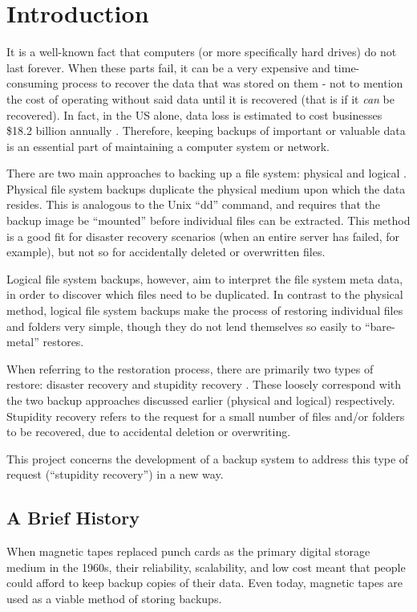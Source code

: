 \chapter{Introduction}

It is a well-known fact that computers (or more specifically hard drives) do
not last forever. When these parts fail, it can be a very expensive and
time-consuming process to recover the data that was stored on them - not to
mention the cost of operating without said data until it is recovered (that is
if it \emph{can} be recovered). In fact, in the US alone, data loss is
estimated to cost businesses \$18.2 billion annually \cite{smith03}. Therefore,
keeping backups of important or valuable data is an essential part of
maintaining a computer system or network.

There are two main approaches to backing up a file system: physical and
logical \cite{hutchinson99}. Physical file system backups duplicate the physical
medium upon which the data resides. This is analogous to the Unix ``dd''
command, and requires that the backup image be ``mounted'' before individual
files can be extracted. This method is a good fit for disaster recovery
scenarios (when an entire server has failed, for example), but not so for
accidentally deleted or overwritten files.

Logical file system backups, however, aim to interpret the file system meta
data, in order to discover which files need to be duplicated.  In contrast to
the physical method, logical file system backups make the process of restoring
individual files and folders very simple, though they do not lend themselves so
easily to ``bare-metal'' restores.

When referring to the restoration process, there are primarily two types of
restore: disaster recovery and stupidity recovery \cite{hutchinson99}. These
loosely correspond with the two backup approaches discussed earlier (physical
and logical) respectively. Stupidity recovery refers to the request for a small
number of files and/or folders to be recovered, due to accidental deletion or
overwriting.

This project concerns the development of a backup system to address this type
of request (``stupidity recovery'') in a new way.

\section{A Brief History}

When magnetic tapes replaced punch cards as the primary digital storage medium
in the 1960s, their reliability, scalability, and low cost meant that people
could afford to keep backup copies of their data. Even today, magnetic tapes
are used as a viable method of storing backups.

